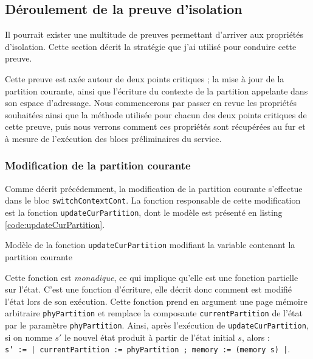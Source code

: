 		\subsection{Déroulement de la preuve d'isolation}

		Il pourrait exister une multitude de preuves permettant d'arriver aux propriétés d'isolation. Cette section décrit la stratégie que j'ai utilisé pour conduire cette preuve.

		Cette preuve est axée autour de deux points critiques ; la mise à jour de la partition courante, ainsi que l'écriture du contexte de la partition appelante dans son espace d'adressage. Nous commencerons par passer en revue les propriétés souhaitées ainsi que la méthode utilisée pour chacun des deux points critiques de cette preuve, puis nous verrons comment ces propriétés sont récupérées au fur et à mesure de l'exécution des blocs préliminaires du service.

			\subsubsection{Modification de la partition courante}
			\label{sec:curPartModif}

			Comme décrit précédemment, la modification de la partition courante s'effectue dans le bloc \texttt{switchContextCont}. La fonction responsable de cette modification est la fonction \texttt{updateCurPartition}, dont le modèle est présenté en listing \ref{code:updateCurPartition}.

			\begin{listing}[!ht]
				\caption{Modèle de la fonction \texttt{updateCurPartition} modifiant la variable contenant la partition courante}
				\label{code:updateCurPartition}
			\end{listing}

			Cette fonction est \emph{monadique}, ce qui implique qu'elle est une fonction partielle sur l'état. C'est une fonction d'écriture, elle décrit donc comment est modifié l'état lors de son exécution. Cette fonction prend en argument une page mémoire arbitraire \texttt{phyPartition} et remplace la composante \texttt{currentPartition} de l'état par le paramètre \texttt{phyPartition}. Ainsi, après l'exécution de \texttt{updateCurPartition}, si on nomme $s'$ le nouvel état produit à partir de l'état initial $s$, alors : \\

			\texttt{s' := {| currentPartition := phyPartition ; memory := (memory s) |}}.\\

